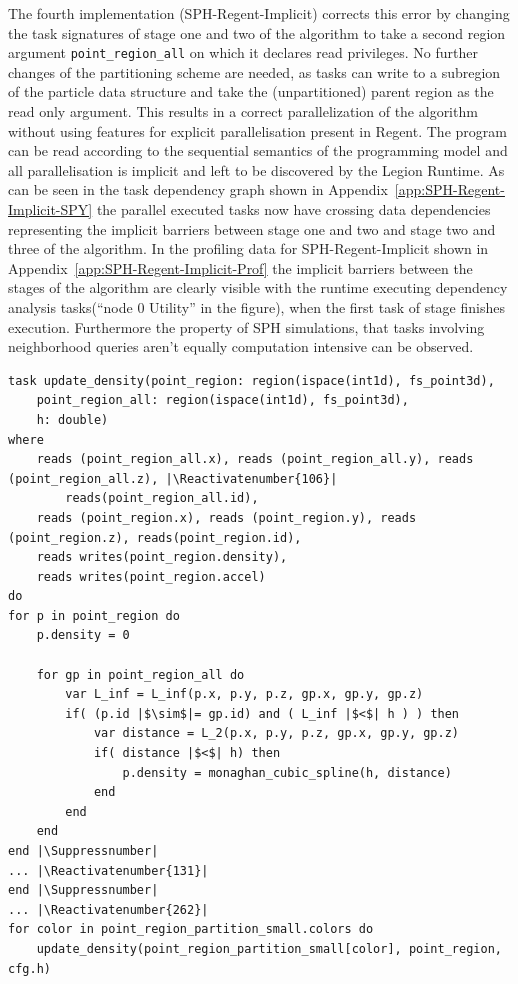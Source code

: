 \documentclass{article}      %
\begin{document}
The fourth implementation (SPH-Regent-Implicit) corrects this error by changing the task signatures of stage one and two of the algorithm to take a second region argument \lstinline{point_region_all} on which it declares read privileges. No further changes of the partitioning scheme are needed, as tasks can write to a subregion of the particle data structure and take the (unpartitioned) parent region as the read only argument. This results in a correct parallelization of the algorithm without using features for explicit parallelisation present in Regent. The program can be read according to the sequential semantics of the programming model and all parallelisation is implicit and left to be discovered by the Legion Runtime.
As can be seen in the task dependency graph shown in Appendix~\ref{app:SPH-Regent-Implicit-SPY} the parallel executed tasks now have crossing data dependencies representing the implicit barriers between stage one and two and stage two and three of the algorithm. In the profiling data for SPH-Regent-Implicit shown in Appendix~\ref{app:SPH-Regent-Implicit-Prof} the implicit barriers between the stages of the algorithm are clearly visible with the runtime executing dependency analysis tasks(``node 0 Utility'' in the figure), when the first task of stage finishes execution. Furthermore the property of SPH simulations, that tasks involving neighborhood queries aren't equally computation intensive can be observed.
\lstset{
	captionpos=b,
	style=regent,
	basicstyle=\scriptsize,
	numbers=left,
	numberstyle=\tiny,
	columns=fullflexible,
	firstnumber=102,
	stepnumber=1,
	escapeinside=||,
}
\begin{lstlisting}[frame=single,label={lst:correct_task},
	caption={Task signature for the first stage of the algorithm and its task launch in the main loop of SPH-Regent-Implicit}]
task update_density(point_region: region(ispace(int1d), fs_point3d),
	point_region_all: region(ispace(int1d), fs_point3d),
	h: double)
where
	reads (point_region_all.x), reads (point_region_all.y), reads (point_region_all.z), |\Reactivatenumber{106}|
		reads(point_region_all.id), 
	reads (point_region.x), reads (point_region.y), reads (point_region.z), reads(point_region.id),
	reads writes(point_region.density),
	reads writes(point_region.accel)
do
for p in point_region do
	p.density = 0

	for gp in point_region_all do
		var L_inf = L_inf(p.x, p.y, p.z, gp.x, gp.y, gp.z)
		if( (p.id |$\sim$|= gp.id) and ( L_inf |$<$| h ) ) then 
			var distance = L_2(p.x, p.y, p.z, gp.x, gp.y, gp.z)
			if( distance |$<$| h) then
				p.density = monaghan_cubic_spline(h, distance)
			end
		end
	end
end |\Suppressnumber|
... |\Reactivatenumber{131}|
end |\Suppressnumber|
... |\Reactivatenumber{262}|
for color in point_region_partition_small.colors do 
	update_density(point_region_partition_small[color], point_region, cfg.h)
\end{lstlisting}
\end{document}
